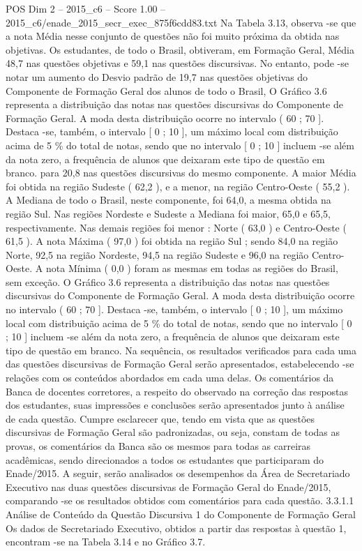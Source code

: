 \begin{textsample}{POS Dim 2 – 2015\_c6 – Score 1.00 – 2015\_c6/enade\_2015\_secr\_exec\_875f6cdd83.txt}
Na Tabela 3.13, observa -se que a nota Média nesse conjunto de questões não foi muito próxima da obtida nas objetivas.
Os estudantes, de todo o Brasil, obtiveram, em Formação Geral, Média 48,7 nas questões objetivas e 59,1 nas questões discursivas.
No entanto, pode -se notar um aumento do Desvio padrão de 19,7 nas questões objetivas do Componente de Formação Geral dos alunos de todo o Brasil, O Gráfico 3.6 representa a distribuição das notas nas questões discursivas do Componente de Formação Geral.
A moda desta distribuição ocorre no intervalo ( 60 ; 70 ].
Destaca -se, também, o intervalo [ 0 ; 10 ], um máximo local com distribuição acima de 5 \% do total de notas, sendo que no intervalo [ 0 ; 10 ] incluem -se além da nota zero, a frequência de alunos que deixaram este tipo de questão em branco. para 20,8 nas questões discursivas do mesmo componente.
A maior Média foi obtida na região Sudeste ( 62,2 ), e a menor, na região Centro-Oeste ( 55,2 ).
A Mediana de todo o Brasil, neste componente, foi 64,0, a mesma obtida na região Sul.
Nas regiões Nordeste e Sudeste a Mediana foi maior, 65,0 e 65,5, respectivamente.
Nas demais regiões foi menor : Norte ( 63,0 ) e Centro-Oeste ( 61,5 ).
A nota Máxima ( 97,0 ) foi obtida na região Sul ; sendo 84,0 na região Norte, 92,5 na região Nordeste, 94,5 na região Sudeste e 96,0 na região Centro-Oeste.
A nota Mínima ( 0,0 ) foram as mesmas em todas as regiões do Brasil, sem exceção.
O Gráfico 3.6 representa a distribuição das notas nas questões discursivas do Componente de Formação Geral.
A moda desta distribuição ocorre no intervalo ( 60 ; 70 ].
Destaca -se, também, o intervalo [ 0 ; 10 ], um máximo local com distribuição acima de 5 \% do total de notas, sendo que no intervalo [ 0 ; 10 ] incluem -se além da nota zero, a frequência de alunos que deixaram este tipo de questão em branco.
Na sequência, os resultados verificados para cada uma das questões discursivas de Formação Geral serão apresentados, estabelecendo -se relações com os conteúdos abordados em cada uma delas.
Os comentários da Banca de docentes corretores, a respeito do observado na correção das respostas dos estudantes, suas impressões e conclusões serão apresentados junto à análise de cada questão.
Cumpre esclarecer que, tendo em vista que as questões discursivas de Formação Geral são padronizadas, ou seja, constam de todas as provas, os comentários da Banca são os mesmos para todas as carreiras acadêmicas, sendo direcionados a todos os estudantes que participaram do Enade/2015.
A seguir, serão analisados os desempenhos da Área de Secretariado Executivo nas duas questões discursivas de Formação Geral do Enade/2015, comparando -se os resultados obtidos com comentários para cada questão. 3.3.1.1 Análise de Conteúdo da Questão Discursiva 1 do Componente de Formação Geral Os dados de Secretariado Executivo, obtidos a partir das respostas à questão 1, encontram -se na Tabela 3.14 e no Gráfico 3.7.

\end{textsample}
